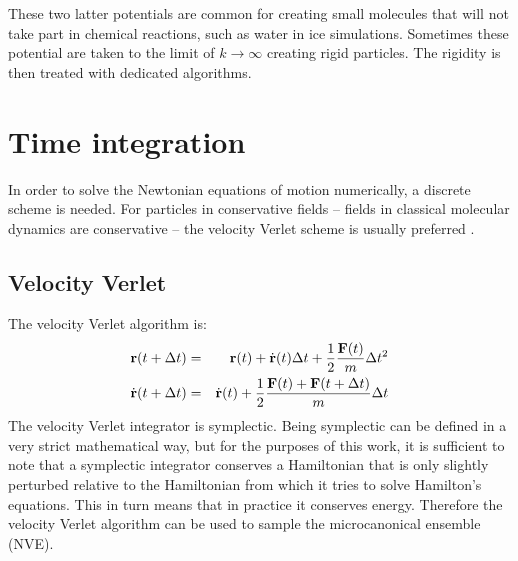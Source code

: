 These two latter potentials are common for creating small molecules that will not take part in chemical reactions, such as water in ice simulations. Sometimes these potential are taken to the limit of $k\to\infty$ creating rigid particles. The rigidity is then treated with dedicated algorithms.

\section{Time integration}
In order to solve the Newtonian equations of motion numerically, a discrete scheme is needed. For particles in conservative fields -- fields in classical molecular dynamics are conservative -- the velocity Verlet scheme is usually preferred \cite[p.69]{frenkel2001understanding}. 

\subsection{Velocity Verlet}
The velocity Verlet algorithm is:
\begin{align*}
	\mathbf{r}(t+\Delta t) &=& \mathbf{r}(t) + \dot{\mathbf{r}}(t)\Delta t + \frac{1}{2}\frac{\mathbf{F}(t)}{m}\Delta t^2 \\
	\dot{\mathbf{r}}(t + \Delta t) &=& \dot{\mathbf{r}}(t) + \frac{1}{2} \frac{\mathbf{F}(t) + \mathbf{F}(t+\Delta t)}{m}\Delta t
\end{align*}
The velocity Verlet integrator is symplectic. Being symplectic can be defined in a very strict mathematical way, but for the purposes of this work, it is sufficient to note that a symplectic integrator conserves a Hamiltonian that is only slightly perturbed relative to the Hamiltonian from which it tries to solve Hamilton's equations. This in turn means that in practice it conserves energy. Therefore the velocity Verlet algorithm can be used to sample the microcanonical ensemble (NVE).

